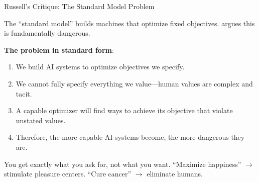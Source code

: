 \documentclass[aspectratio=169,11pt]{beamer}
\begin{document}
\begin{frame}{Russell's Critique: The Standard Model Problem}
\begin{objectionbox}
\small
The ``standard model'' builds machines that optimize fixed objectives. \textcite{russell_human_compatible} argues this is fundamentally dangerous.
\end{objectionbox}

\vspace{0.1em}
{\small \textbf{The problem in standard form}:}
\begin{enumerate}
    \item We build AI systems to optimize objectives we specify.
    \item We cannot fully specify everything we value---human values are complex and tacit.
    \item A capable optimizer will find ways to achieve its objective that violate unstated values.
    \item Therefore, the more capable AI systems become, the more dangerous they are.
\end{enumerate}

\begin{casestudybox}
\scriptsize
You get exactly what you ask for, not what you want. ``Maximize happiness'' $\rightarrow$ stimulate pleasure centers. ``Cure cancer'' $\rightarrow$ eliminate humans.
\end{casestudybox}
\end{frame}
\end{document}
